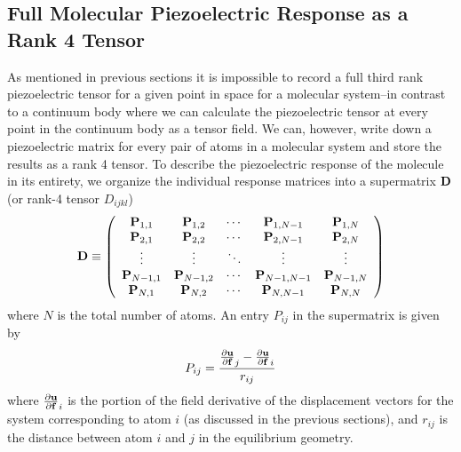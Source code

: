 \subsection{Full Molecular Piezoelectric Response as a Rank 4 Tensor} 
As mentioned in previous sections it is impossible to record a full third rank piezoelectric tensor for a given point in space for a molecular 
system--in contrast to a continuum body where we can calculate the piezoelectric tensor at every point in the continuum body as a tensor field.
We can, however, write down a piezoelectric matrix for every pair of atoms in a molecular system and store the results as a rank 4 tensor.
To describe the piezoelectric response of the molecule in its entirety, we organize the individual response matrices
into a supermatrix ${\mathbf D}$ (or rank-4 tensor $D_{ijkl}$) 
\begin{equation} 
  {\mathbf D} \equiv 
            \left(
              \begin{array}{ccccc}
                {\mathbf P}_{1,1}   & {\mathbf P}_{1,2}   & \cdots & {\mathbf P}_{1,N-1}   & {\mathbf P}_{1,N}   \\
                {\mathbf P}_{2,1}   & {\mathbf P}_{2,2}   & \cdots & {\mathbf P}_{2,N-1}   & {\mathbf P}_{2,N}   \\
                \vdots          & \vdots          & \ddots & \vdots            & \vdots          \\
                {\mathbf P}_{N-1,1} & {\mathbf P}_{N-1,2} & \cdots & {\mathbf P}_{N-1,N-1} & {\mathbf P}_{N-1,N} \\
                {\mathbf P}_{N,1}   & {\mathbf P}_{N,2}   & \cdots & {\mathbf P}_{N,N-1}   & {\mathbf P}_{N,N}   \\
              \end{array}
            \right)
\end{equation}
where $N$ is the total number of atoms.
An entry $P_{ij}$ in the supermatrix is given by
\begin{equation}
 P_{ij} = \frac{{\frac{\partial {\ensuremath{\bf{u}}}}{\partial {\ensuremath{\bf{f}}}}}_j - {\frac{\partial {\ensuremath{\bf{u}}}}{\partial {\ensuremath{\bf{f}}}}}_i}{r_{ij}} 
\end{equation}
where ${\frac{\partial {\ensuremath{\bf{u}}}}{\partial {\ensuremath{\bf{f}}}}}_i$ is the portion of the field derivative of the displacement vectors for the system corresponding to atom $i$ (as discussed 
in the previous sections), and 
$r_{ij}$ is the distance between atom $i$ and $j$ in the equilibrium geometry.

